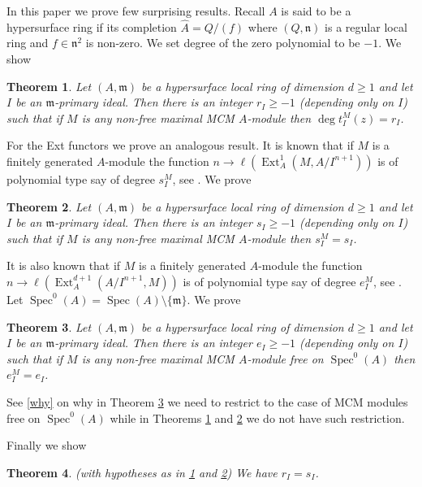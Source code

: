 \documentclass{amsart}
\newcommand{\n}{\mathfrak{n} }
\newcommand{\m}{\mathfrak{m} }
\newcommand{\rt}{\rightarrow}
\newcommand{\wh}{\widehat }
\newcommand{\Spec}{\operatorname{Spec}}
\newcommand{\Ext}{\operatorname{Ext}}
\theoremstyle{plain}
\newtheorem{theorem}{Theorem}[section]
\theoremstyle{definition}
\theoremstyle{remark}
\begin{document}
In this paper we prove  few surprising  results.  Recall $A$ is said to be a hypersurface ring if its completion $\wh{A} = Q/(f)$ where $(Q, \n)$ is a regular local ring and $f \in \n^2$ is non-zero. We set degree of the zero polynomial to be $-1$. We show
\begin{theorem}\label{main}
Let $(A,\m)$ be a hypersurface local ring of dimension $d \geq 1$ and let $I$ be an $\m$-primary ideal. Then there is an  integer $r_I \geq -1$ (depending only on $I$) such that if $M$ is any non-free maximal MCM
$A$-module then $\deg t_I^M(z) = r_I$.
\end{theorem}



\s For the Ext functors we prove an analogous result. It is known that if $M$ is a finitely generated $A$-module the function $n \rt \ell(\Ext_A^1(M, A/I^{n+1}))$ is of polynomial type say of degree $s_I^M$, see \cite[Corollary 4]{Theo}.  We prove
\begin{theorem}\label{main-e1}
Let $(A,\m)$ be a hypersurface local ring of dimension $d \geq 1$ and let $I$ be an $\m$-primary ideal. Then there is an  integer $s_I \geq -1$ (depending only on $I$) such that if $M$ is any non-free maximal MCM
$A$-module then $s_I^M = s_I$.
\end{theorem}
It is also known that if $M$ is a finitely generated $A$-module the function $n \rt \ell(\Ext_A^{d+1}(A/I^{n+1}, M))$ is of polynomial type say of degree $e_I^M$, see \cite[Theorem 5]{Theo}.  Let $\Spec^0(A) = \Spec(A) \setminus \{ \m \}$. We prove
\begin{theorem}\label{main-e2}
Let $(A,\m)$ be a hypersurface local ring of dimension $d \geq 1$ and let $I$ be an $\m$-primary ideal. Then there is an  integer $e_I \geq -1$ (depending only on $I$) such that if $M$ is any non-free maximal MCM
$A$-module  free on $\Spec^0(A)$ then $e_I^M = e_I$.
\end{theorem}
See \ref{why} on why in Theorem \ref{main-e2} we need to restrict to the case of MCM modules free on $\Spec^0(A)$ while in Theorems  \ref{main} and \ref{main-e1} we do not have such restriction.

Finally we show
\begin{theorem}\label{te}
(with hypotheses as in \ref{main} and \ref{main-e1}) We have $r_I = s_I$.
\end{theorem}
\end{document}
